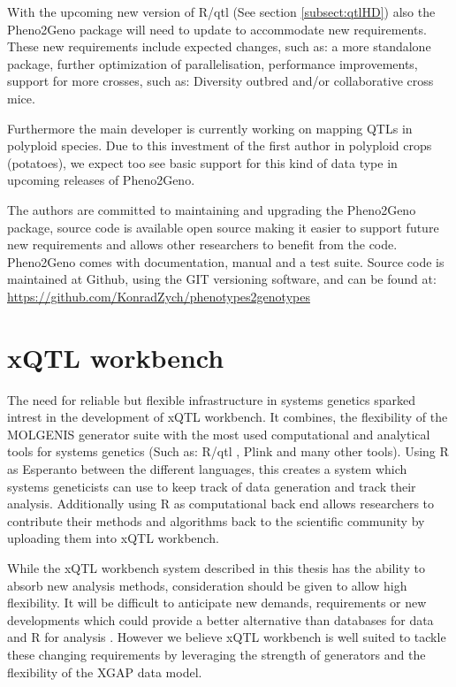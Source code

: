 With the upcoming new version of R/qtl (See section \ref{subsect:qtlHD}) also the Pheno2Geno 
package will need to update to accommodate new requirements. These new requirements include 
expected changes, such as: a more standalone package, further optimization of parallelisation, 
performance improvements, support for more crosses, such as: Diversity outbred and/or 
collaborative cross mice.

Furthermore the main developer is currently working on mapping QTLs in polyploid species. Due 
to this investment of the first author in polyploid crops (potatoes), we expect too see basic 
support for this kind of data type in upcoming releases of Pheno2Geno.

The authors are committed to maintaining and upgrading the Pheno2Geno package, source code 
is available open source making it easier to support future new requirements and allows other 
researchers to benefit from the code. Pheno2Geno comes with documentation, manual and a test 
suite. Source code is maintained at Github, using the GIT versioning software, and can be 
found at:\\
\url{https://github.com/KonradZych/phenotypes2genotypes}

\section{xQTL workbench}
\label{sect:xQTLworkbench}
The need for reliable but flexible infrastructure in systems genetics sparked intrest in the 
development of xQTL workbench. It combines, the flexibility of the MOLGENIS generator suite \cite{Swertz:2010b} 
with the most used computational and analytical tools for systems genetics (Such as: R/qtl 
\cite{Broman:2003, Arends:2010}, Plink \cite{Purcell:2007} and many other tools). Using R as 
Esperanto between the different languages, this creates a system which systems geneticists can 
use to keep track of data generation and track their analysis. Additionally using R as computational 
back end allows researchers to contribute their methods and algorithms back to the scientific 
community by uploading them into xQTL workbench.

While the xQTL workbench system described in this thesis has the ability to absorb new 
analysis methods, consideration should be given to allow high flexibility. It will be 
difficult to anticipate new demands, requirements or new developments which could provide 
a better alternative than databases for data and R for analysis \cite{Arends:2012}. However 
we believe xQTL workbench is well suited to tackle these changing requirements by leveraging 
the strength of generators and the flexibility of the XGAP data model.

